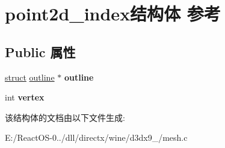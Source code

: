 \hypertarget{structpoint2d__index}{}\section{point2d\+\_\+index结构体 参考}
\label{structpoint2d__index}
\subsection*{Public 属性}
\begin{DoxyCompactItemize}
\item 
\mbox{\label{structpoint2d__index_aa25a8b4e82a77aaa85df0bbef80ce72c}} 
\hyperlink{interfacestruct}{struct} \hyperlink{structoutline}{outline} $\ast$ {\bfseries outline}
\item 
\mbox{\label{structpoint2d__index_af499f56fd1ead19c3963393deeacbbc1}} 
int {\bfseries vertex}
\end{DoxyCompactItemize}


该结构体的文档由以下文件生成\+:\begin{DoxyCompactItemize}
\item 
E\+:/\+React\+O\+S-\/0../dll/directx/wine/d3dx9\+\_/mesh.\+c\end{DoxyCompactItemize}
